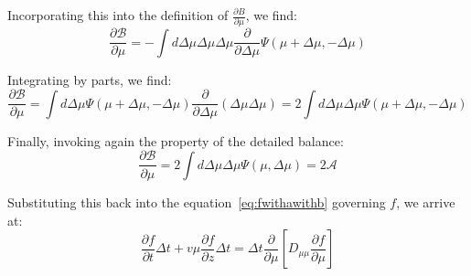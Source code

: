 
Incorporating this into the definition of $\frac{\partial B}{\partial \mu}$, we find:
%
\begin{equation}
\frac{\partial \mathcal B}{\partial \mu} = - \int d\Delta\mu \Delta\mu\Delta\mu \frac{\partial}{\partial \Delta\mu} \Psi(\mu+\Delta\mu, -\Delta\mu)
\end{equation}

Integrating by parts, we find:
%
\begin{equation}
\frac{\partial \mathcal B}{\partial \mu} = \int d\Delta\mu \Psi(\mu+\Delta\mu, -\Delta\mu) \frac{\partial}{\partial \Delta \mu} (\Delta\mu\Delta\mu) =  2 \int d\Delta\mu \Delta\mu \Psi(\mu+\Delta\mu, -\Delta\mu)
\end{equation}

Finally, invoking again the property of the detailed balance: 
%
\begin{equation}
\frac{\partial \mathcal B}{\partial \mu} = 2 \int d\Delta\mu \Delta\mu \Psi(\mu, \Delta\mu) = 2 \mathcal A
\end{equation}

Substituting this back into the equation~\ref{eq:fwithawithb} governing \( f \), we arrive at:
%
\begin{equation}
\frac{\partial f}{\partial t} \Delta t  +  v \mu \frac{\partial f}{\partial z} \Delta t = 
\Delta t \frac{\partial}{\partial\mu} \left[D_{\mu\mu}\frac{\partial f}{\partial\mu}\right]
\end{equation}

